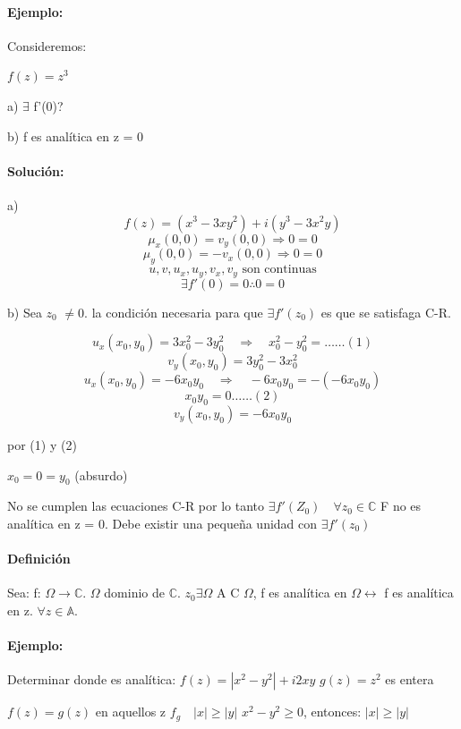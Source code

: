 \documentclass[a4paper,12pt]{article}
\begin{document}
\paragraph{Ejemplo: } Consideremos:

$f(z) = z^3$

a) $\exists$ f'(0)?

b) f es analítica en z = 0

\paragraph{Solución:}

a) \[f(z) = (x^3 - 3xy^2) + i(y^3 - 3x^2y)\]
\[\mu_x(0, 0) = v_y(0, 0) \Rightarrow 0 = 0\]
\[\mu_y(0, 0) = -v_x(0, 0) \Rightarrow 0 = 0\]
\[u, v, u_x, u_y, v_x, v_y \text{ son continuas}\]
\[\exists f'(0) = 0 \therefore 0 = 0\]


b) Sea $z_0$ $\neq 0$. la condición necesaria para que $\exists f'(z_0)$ es que se satisfaga C-R.

\[
u_x(x_0, y_0) = 3x_0^2 - 3y_0^2 \quad \Rightarrow \quad x_0^2 - y_0^2 = \ldots \ldots (1)
\]
\[
v_y(x_0, y_0) = 3y_0^2 - 3x_0^2
\]
\[
u_x(x_0, y_0) = -6x_0 y_0 \quad \Rightarrow \quad -6x_0 y_0 = -(-6x_0 y_0)
\]
\[x_0 y_0 = 0  \ldots \ldots (2)\]
\[
v_y(x_0, y_0) = -6x_0 y_0
\]

por (1) y (2)

$x_0 = 0 = y_0$ (absurdo)

No se cumplen las ecuaciones C-R por lo tanto $\exists f'(Z_0) \quad \forall z_0 \in \mathbb{C}$
F no es analítica en z = 0.
Debe existir una pequeña unidad con $\exists f'(z_0)$

\paragraph{Definición}

Sea: f: $\Omega \rightarrow \mathbb{C}$. $\Omega$ dominio de $\mathbb{C}$. $z_0 \exists \Omega$
A C $\Omega$, f es analítica en $\Omega \leftrightarrow$ f es analítica en z. $\forall z \in \mathbb{A}$.

\paragraph{Ejemplo:}

Determinar donde es analítica: $f(z) = |x^2 - y^2| + i2xy$
$g(z) = z^2$ es entera

$f(z) = g(z)$ en aquellos z $f_g \quad |x| \geq |y|$
$x^2 - y^2 \geq 0$, entonces: $|x| \geq |y|$
\end{document}
